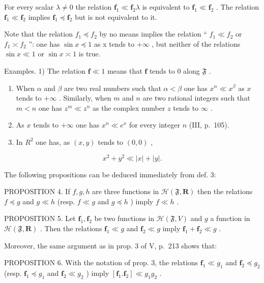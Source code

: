 For every scalar \(\lambda \neq 0\) the relation \(\mathbf{f}_1 \ll \mathbf{f}_2\lambda\) is equivalent to \(\mathbf{f}_1 \ll \mathbf{f}_2\) . The relation \(\mathbf{f}_1 \ll \mathbf{f}_2\) implies \(\mathbf{f}_1 \preccurlyeq \mathbf{f}_2\) but is not equivalent to it.

Note that the relation \(f_{1} \preccurlyeq f_{2}\) by no means implies the relation `` \(f_{1} \ll f_{2}\) or \(f_{1} \asymp f_{2}\) '': one has \(\sin x \preccurlyeq 1\) as x tends to \(+\infty\) , but neither of the relations \(\sin x \ll 1\) or \(\sin x \asymp 1\) is true.

Examples. 1) The relation \(\mathbf{f} \ll 1\) means that \(\mathbf{f}\) tends to 0 along \(\mathfrak{F}\) .

\begin{enumerate}
\def\labelenumi{\arabic{enumi})}
\setcounter{enumi}{1}
\item
  When \(\alpha\) and \(\beta\) are two real numbers such that \(\alpha < \beta\) one has \(x^{\alpha} \ll x^{\beta}\) as \(x\) tends to \(+\infty\) . Similarly, when \(m\) and \(n\) are two rational integers such that \(m < n\) one has \(z^{m} \ll z^{n}\) as the complex number \(z\) tends to \(\infty\) .
\item
  As \(x\) tends to \(+\infty\) one has \(x^n \ll e^x\) for every integer \(n\) (III, p.~105).
\item
  In \(R^{2}\) one has, as \((x, y)\) tends to \((0, 0)\) ,
\end{enumerate}

\[
x ^ {2} + y ^ {2} \ll | x | + | y |.
\]

The following propositions can be deduced immediately from def. 3:

PROPOSITION 4. If \(f, g, h\) are three functions in \(\mathcal{H}(\mathfrak{F}, \mathbf{R})\) then the relations \(f \preccurlyeq g\) and \(g \ll h\) (resp. \(f \ll g\) and \(g \preccurlyeq h\) ) imply \(f \ll h\) .

PROPOSITION 5. Let \(\mathbf{f}_1, \mathbf{f}_2\) be two functions in \(\mathcal{H}(\mathfrak{F}, V)\) and \(g\) a function in \(\mathcal{H}(\mathfrak{F}, \mathbf{R})\) . Then the relations \(\mathbf{f}_1 \ll g\) and \(\mathbf{f}_2 \ll g\) imply \(\mathbf{f}_1 + \mathbf{f}_2 \ll g\) .

Moreover, the same argument as in prop. 3 of V, p.~213 shows that:

PROPOSITION 6. With the notation of prop. 3, the relations \(\mathbf{f}_1 \ll g_1\) and \(\mathbf{f}_2 \preccurlyeq g_2\) (resp. \(\mathbf{f}_1 \preccurlyeq g_1\) and \(\mathbf{f}_2 \ll g_2\) ) imply \([\mathbf{f}_1.\mathbf{f}_2] \ll g_1g_2\) .

